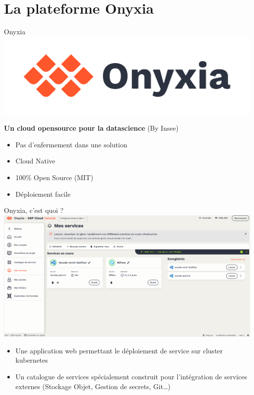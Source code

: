 \documentclass[
  12pt,
  ignorenonframetext,
  aspectratio=169,
  french,
  aspectratio=169]{beamer}
\providecommand{\tightlist}{%
  \setlength{\itemsep}{0pt}\setlength{\parskip}{0pt}}
\begin{document}
\section{La plateforme Onyxia}\label{la-plateforme-onyxia}

\begin{frame}{Onyxia}
\label{onyxia}
\includegraphics[width=\linewidth,height=0.2\textheight,keepaspectratio]{img/logoOnyxia.png}

\textbf{Un cloud opensource pour la datascience} (By Insee)

\begin{block}{}
\label{section-1}
\begin{itemize}
\tightlist
\item
  Pas d'enfermement dans une solution
\item
  Cloud Native
\item
  100\% Open Source (MIT)
\item
  Déploiement facile
\end{itemize}
\end{block}
\end{frame}

\begin{frame}{Onyxia, c'est quoi ?}
\label{onyxia-cest-quoi}
\includegraphics[width=\linewidth,height=0.7\textheight,keepaspectratio]{img/interface-onyxia.png}

\begin{itemize}
\tightlist
\item
  Une application web permettant le déploiement de service sur cluster
  kubernetes
\item
  Un catalogue de services spécialement construit pour l'intégration de
  services externes (Stockage Objet, Gestion de secrets, Git\ldots)
\end{itemize}
\end{frame}
\end{document}
